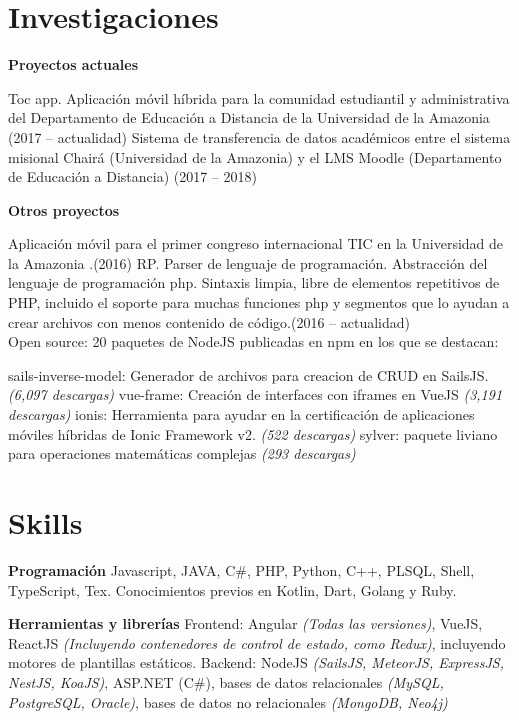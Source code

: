 \documentclass[letterpaper]{article}
\renewenvironment{itemize}{
  \begin{list}{}{
    \setlength{\leftmargin}{1.5em}
  }
}{
  \end{list}
}
\begin{document}
\section*{Investigaciones}
\begin{itemize}
	\item {\bf Proyectos actuales}
	
	\leftskip 0.5in
	\parindent -0.5in
	\subitem Toc app. Aplicaci\'on m\'ovil h\'ibrida para la comunidad estudiantil y administrativa del Departamento de Educaci\'on a Distancia de la Universidad de la Amazonia (2017 -- actualidad)
	\subitem Sistema de transferencia de datos acad\'emicos entre el sistema misional Chair\'a (Universidad de la Amazonia) y el LMS Moodle (Departamento de Educaci\'on a Distancia) (2017 -- 2018)
	
	
	\leftskip 0in
	\item {\bf Otros proyectos}
	
	\leftskip 0.5in
	\parindent -0.5in
    \subitem Aplicaci\'on m\'ovil para el primer congreso internacional TIC en la Universidad de la Amazonia .(2016)
	\subitem RP. Parser de lenguaje de programaci\'on. Abstracci\'on del lenguaje de programaci\'on php. Sintaxis limpia, libre de elementos repetitivos de PHP, incluido el soporte para muchas funciones php y segmentos que lo ayudan a crear archivos con menos contenido de c\'odigo.(2016 -- actualidad)
	\\
	\subitem Open source: 20 paquetes de NodeJS publicadas en npm en los que se destacan:

	\leftskip 1in
	\parindent -0.5in
	\subitem sails-inverse-model: Generador de archivos para creacion de CRUD en SailsJS. \textit{(6,097 descargas)}
	\subitem vue-frame: Creaci\'on de interfaces con iframes en VueJS \textit{(3,191 descargas)}
	\subitem ionis: Herramienta para ayudar en la certificación de aplicaciones m\'oviles h\'ibridas de Ionic Framework v2. \textit{(522 descargas)}
	\subitem sylver: paquete liviano para operaciones matem\'aticas complejas \textit{(293 descargas)}
\end{itemize}


\section*{Skills}
\begin{itemize}
\item {\bf Programaci\'on}
\subitem Javascript, JAVA, C\#, PHP, Python, C++, PLSQL, Shell, TypeScript, Tex. Conocimientos previos en Kotlin, Dart, Golang y Ruby.

\item {\bf Herramientas y librer\'ias}
\subitem Frontend: Angular \textit{(Todas las versiones)}, VueJS, ReactJS \textit{(Incluyendo contenedores de control de estado, como Redux)}, incluyendo motores de plantillas est\'aticos.
\subitem Backend: NodeJS \textit{(SailsJS, MeteorJS, ExpressJS, NestJS, KoaJS)}, ASP.NET (C\#),  bases de datos relacionales \textit{(MySQL, PostgreSQL, Oracle)}, bases de datos no relacionales \textit{(MongoDB, Neo4j)}
\end{itemize}
\end{document}
